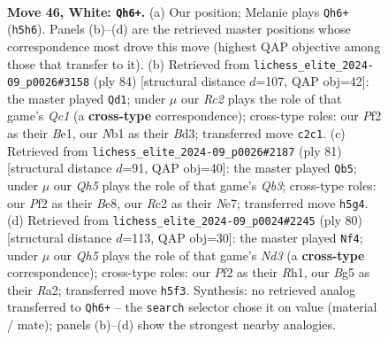 \documentclass[11pt]{article}
\begin{document}
\clearpage

\begin{figure}[p]\centering
\begin{subfigure}{0.46\textwidth}\centering
\resizebox{\linewidth}{!}{%
\newchessgame
\chessboard[
  setfen={1q3k2/r6p/b3p3/p2pbpBQ/P1np3P/8/2R2P2/RN2N1K1 w - - 12 46},
  showmover=false,
  pgfstyle=straightmove, color=movearrow, markmove={h5-h6}
]}
\caption{}
\end{subfigure}\hfill
\begin{subfigure}{0.46\textwidth}\centering
\resizebox{\linewidth}{!}{%
\newchessgame
\chessboard[
  setfen={5q2/3bb1k1/2r2pp1/4p2p/p6P/n2BP1N1/5PP1/R1Q1B1K1 w - - 0 43},
  showmover=false,
  pgfstyle=straightmove, color=movearrow, markmove={c1-d1}
]}
\caption{}
\end{subfigure}
\\[4pt]
\begin{subfigure}{0.46\textwidth}\centering
\resizebox{\linewidth}{!}{%
\newchessgame
\chessboard[
  setfen={4br2/kp2n3/1q2P3/4QBPp/p6P/Pp2N3/6P1/3R3K b - - 8 41},
  showmover=false,
  pgfstyle=straightmove, color=movearrow, markmove={b6-b5}
]}
\caption{}
\end{subfigure}\hfill
\begin{subfigure}{0.46\textwidth}\centering
\resizebox{\linewidth}{!}{%
\newchessgame
\chessboard[
  setfen={5rk1/4p2p/3pPb2/1q5p/1pn1Q3/3N1PP1/R5K1/7R w - - 0 41},
  showmover=false,
  pgfstyle=straightmove, color=movearrow, markmove={d3-f4}
]}
\caption{}
\end{subfigure}
\caption{\textbf{Move 46, White: \texttt{Qh6+}.} (a) Our position; Melanie plays \texttt{Qh6+} (\texttt{h5h6}). Panels (b)--(d) are the retrieved master positions whose correspondence most drove this move (highest QAP objective among those that transfer to it). (b) Retrieved from \texttt{lichess\_elite\_2024-09\_p0026\#3158} (ply 84) [structural distance $d$=107, QAP obj=42]: the master played \texttt{Qd1}; under $\mu$ our \emph{Rc2} plays the role of that game's \emph{Qc1} (a \textbf{cross-type} correspondence); cross-type roles: our \emph{P}f2 as their \emph{B}e1, our \emph{N}b1 as their \emph{B}d3; transferred move \texttt{c2c1}. (c) Retrieved from \texttt{lichess\_elite\_2024-09\_p0026\#2187} (ply 81) [structural distance $d$=91, QAP obj=40]: the master played \texttt{Qb5}; under $\mu$ our \emph{Qh5} plays the role of that game's \emph{Qb3}; cross-type roles: our \emph{P}f2 as their \emph{B}e8, our \emph{R}c2 as their \emph{N}e7; transferred move \texttt{h5g4}. (d) Retrieved from \texttt{lichess\_elite\_2024-09\_p0024\#2245} (ply 80) [structural distance $d$=113, QAP obj=30]: the master played \texttt{Nf4}; under $\mu$ our \emph{Qh5} plays the role of that game's \emph{Nd3} (a \textbf{cross-type} correspondence); cross-type roles: our \emph{P}f2 as their \emph{R}h1, our \emph{B}g5 as their \emph{R}a2; transferred move \texttt{h5f3}. Synthesis: no retrieved analog transferred to \texttt{Qh6+} -- the \texttt{search} selector chose it on value (material / mate); panels (b)--(d) show the strongest nearby analogies.}
\label{fig:thought-m90}
\end{figure}
\end{document}
